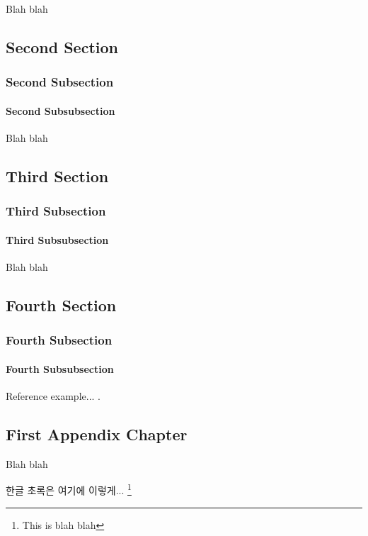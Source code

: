 \documentclass[11pt]{book}
\begin{document}
Blah blah

\section{Second Section}

\subsection{Second Subsection}

\subsubsection{Second Subsubsection}

Blah blah

\section{Third Section}

\subsection{Third Subsection}

\subsubsection{Third Subsubsection}

Blah blah

\section{Fourth Section}

\subsection{Fourth Subsection}

\subsubsection{Fourth Subsubsection}

Reference example... \cite{Tsa2006}.




\begin{appendices}
\chapter{First Appendix Chapter}
Blah blah
\end{appendices}

\newpage

\pagestyle{plain}

\renewcommand\thefootnote{\fnsymbol{footnote}}

한글 초록은 여기에 이렇게... \footnote[1]{This is blah blah}
\end{document}
